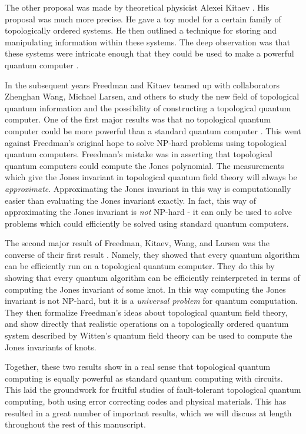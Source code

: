 The other proposal was made by theoretical physicist Alexei Kitaev \cite{kitaev2003fault}. His proposal was much more precise. He gave a toy model for a certain family of topologically ordered systems. He then outlined a technique for storing and manipulating information within these systems. The deep observation was that these systems were intricate enough that they could be used to make a powerful quantum computer \cite{mochon2003anyons}.

In the subsequent years Freedman and Kitaev teamed up with collaborators Zhenghan Wang, Michael Larsen, and others to study the new field of topological quantum information and the possibility of constructing a topological quantum computer. One of the first major results was that no topological quantum computer could be more powerful than a standard quantum computer \cite{freedman2002simulation}. This went against Freedman’s original hope to solve NP-hard problems using topological quantum computers. Freedman’s mistake was in asserting that topological quantum computers could compute the Jones polynomial. The measurements which give the Jones invariant in topological quantum field theory will always be \textit{approximate}. Approximating the Jones invariant in this way is computationally easier than evaluating the Jones invariant exactly. In fact, this way of approximating the Jones invariant is \textit{not} NP-hard - it can only be used to solve problems which could efficiently be solved using standard quantum computers.

The second major result of Freedman, Kitaev, Wang, and Larsen was the converse of their first result \cite{freedman2002modular}. Namely, they showed that every quantum algorithm can be efficiently run on a topological quantum computer. They do this by showing that every quantum algorithm can be efficiently reinterpreted in terms of computing the Jones invariant of some knot. In this way computing the Jones invariant is not NP-hard, but it is a \textit{universal problem} for quantum computation. They then formalize Freedman’s ideas about topological quantum field theory, and show directly that realistic operations on a topologically ordered quantum system described by Witten’s quantum field theory can be used to compute the Jones invariants of knots.

Together, these two results show in a real sense that topological quantum computing is equally powerful as standard quantum computing with circuits. This laid the groundwork for fruitful studies of fault-tolerant topological quantum computing, both using error correcting codes and physical materials. This has resulted in a great number of important results, which we will discuss at length throughout the rest of this manuscript.

